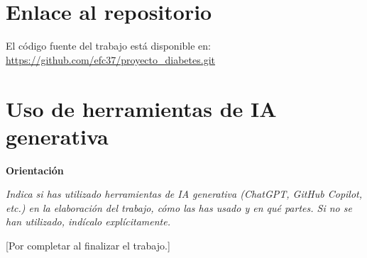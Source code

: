 \documentclass[11pt,a4paper]{article}
\newcommand{\orientaciontitle}{%
  {\small\bfseries\color{blue!60!black}Orientación}\par\smallskip
}
\begin{document}
\section{Enlace al repositorio}

El código fuente del trabajo está disponible en:
\url{https://github.com/efc37/proyecto_diabetes.git}

\section{Uso de herramientas de IA generativa}

\begin{orientacion}
\orientaciontitle
\textit{Indica si has utilizado herramientas de IA generativa (ChatGPT, GitHub Copilot, etc.) en la elaboración del trabajo, cómo las has usado y en qué partes. Si no se han utilizado, indícalo explícitamente.}
\end{orientacion}

[Por completar al finalizar el trabajo.]
\end{document}
